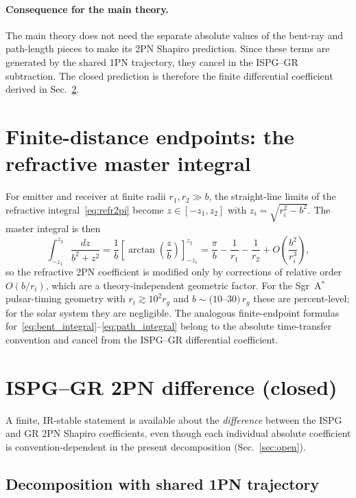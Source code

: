 \documentclass[11pt]{article}
\begin{document}
\paragraph{Consequence for the main theory.}
The main theory does not need the separate absolute values of
the bent-ray and path-length pieces to make its 2PN Shapiro
prediction.  Since these terms are generated by the shared
1PN trajectory, they cancel in the ISPG--GR subtraction.
The closed prediction is therefore the finite differential
coefficient derived in Sec.~\ref{sec:diff}.

\section{Finite-distance endpoints: the refractive master integral}\label{sec:finite}
For emitter and receiver at finite radii $r_1,r_2\gg b$, the
straight-line limits of the refractive
integral~\eqref{eq:refr2pi} become $z\in[-z_1,z_2]$ with
$z_i=\sqrt{r_i^2-b^2}$.  The master integral is then
\begin{equation}
\int_{-z_1}^{z_2}\frac{dz}{b^2+z^2}
=\frac{1}{b}\left[\arctan\!\left(\frac{z}{b}\right)\right]_{-z_1}^{z_2}
=\frac{\pi}{b}-\frac{1}{r_1}-\frac{1}{r_2}+O\!\left(\frac{b^2}{r_i^3}\right),
\label{eq:finite}
\end{equation}
so the refractive 2PN coefficient is modified only by
corrections of relative order $O(b/r_i)$, which are a
theory-independent geometric factor.  For the Sgr~A$^\ast$
pulsar-timing geometry with $r_i\gtrsim 10^2 r_g$ and
$b\sim (10$--$30)\,r_g$ these are percent-level; for the solar
system they are negligible.  The analogous finite-endpoint
formulas for~\eqref{eq:bent_integral}--\eqref{eq:path_integral}
belong to the absolute time-transfer convention and cancel
from the ISPG--GR differential coefficient.

\section{ISPG--GR 2PN difference (closed)}\label{sec:diff}

A finite, IR-stable statement is available about the
\emph{difference} between the ISPG and GR 2PN Shapiro
coefficients, even though each individual absolute coefficient
is convention-dependent in the present decomposition
(Sec.~\ref{sec:open}).

\subsection{Decomposition with shared 1PN trajectory}
\end{document}
